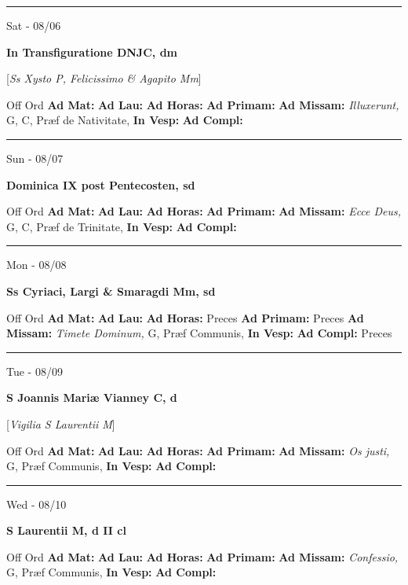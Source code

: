 \documentclass[letterpaper, 10pt]{article}
\begin{document}
\hrule
\begin{center}
Sat - 08/06
\end{center}\textbf{ \large In Transfiguratione DNJC, \textnormal{\normalsize dm}}

[\textit{Ss Xysto P, Felicissimo \& Agapito Mm}]
\begin{justify}
Off Ord
\textbf{Ad Mat: }
\textbf{Ad Lau: }
\textbf{Ad Horas: }
\textbf{Ad Primam: }
\textbf{Ad Missam:} \textit{Illuxerunt, } G, C, Præf de Nativitate, 
\textbf{In Vesp: }
\textbf{Ad Compl: }\end{justify}



\hrule
\begin{center}
Sun - 08/07
\end{center}\textbf{ \large Dominica IX post Pentecosten, \textnormal{\normalsize sd}}
\begin{justify}
Off Ord
\textbf{Ad Mat: }
\textbf{Ad Lau: }
\textbf{Ad Horas: }
\textbf{Ad Primam: }
\textbf{Ad Missam:} \textit{Ecce Deus, } G, C, Præf de Trinitate, 
\textbf{In Vesp: }
\textbf{Ad Compl: }\end{justify}



\hrule
\begin{center}
Mon - 08/08
\end{center}\textbf{ \large Ss Cyriaci, Largi \& Smaragdi Mm, \textnormal{\normalsize sd}}
\begin{justify}
Off Ord
\textbf{Ad Mat: }
\textbf{Ad Lau: }
\textbf{Ad Horas: }Preces
\textbf{Ad Primam: }Preces
\textbf{Ad Missam:} \textit{Timete Dominum, } G, Præf Communis, 
\textbf{In Vesp: }
\textbf{Ad Compl: }Preces\end{justify}



\hrule
\begin{center}
Tue - 08/09
\end{center}\textbf{ \large S Joannis Mariæ Vianney C, \textnormal{\normalsize d}}

[\textit{Vigilia S Laurentii M}]
\begin{justify}
Off Ord
\textbf{Ad Mat: }
\textbf{Ad Lau: }
\textbf{Ad Horas: }
\textbf{Ad Primam: }
\textbf{Ad Missam:} \textit{Os justi, } G, Præf Communis, 
\textbf{In Vesp: }
\textbf{Ad Compl: }\end{justify}



\hrule
\begin{center}
Wed - 08/10
\end{center}\textbf{ \large S Laurentii M, \textnormal{\normalsize d II cl}}
\begin{justify}
Off Ord
\textbf{Ad Mat: }
\textbf{Ad Lau: }
\textbf{Ad Horas: }
\textbf{Ad Primam: }
\textbf{Ad Missam:} \textit{Confessio, } G, Præf Communis, 
\textbf{In Vesp: }
\textbf{Ad Compl: }\end{justify}
\end{document}

